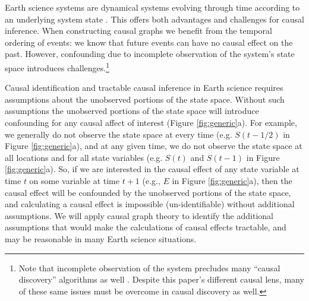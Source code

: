 \documentclass[12pt]{article}
\begin{document}
Earth science systems are dynamical systems evolving through time
according to an underlying system state
\citep{lorenz-1963,lorenz1996predictability,majda-state}. This offers
both advantages and challenges for causal inference. When constructing
causal graphs we benefit from the temporal ordering of events: we know
that future events can have no causal effect on the past. However,
confounding due to incomplete observation of the system's state space
introduces challenges.\footnote{Note that incomplete observation of the
  system precludes many ``causal discovery'' algorithms as well \citep[see ][
  for a great review]{runge2019inferring}. Despite this paper's
  different causal lens, many of these same issues must be overcome in
  causal discovery as well.}

Causal identification and tractable causal inference in Earth science
requires assumptions about the unobserved portions of the state
space. Without such assumptions the unobserved portions of the state
space will introduce confounding for any causal affect of interest
(Figure \ref{fig:generic}a). For example, we generally do not observe
the state space at every time (e.g. $S(t-1/2)$ in Figure
\ref{fig:generic}a), and at any given time, we do not observe the
state space at all locations and for all state variables (e.g. $S(t)$
and $S(t-1)$ in Figure \ref{fig:generic}a). So, if we are interested
in the causal effect of any state variable at time $t$ on some
variable at time $t+1$ (e.g., $E$ in Figure \ref{fig:generic}a), then
the causal effect will be confounded by the unobserved portions of the
state space, and calculating a causal effect is impossible
(un-identifiable) without additional assumptions. We will apply causal
graph theory to identify the additional assumptions that would make
the calculations of causal effects tractable, and may be reasonable in
many Earth science situations.
\end{document}
